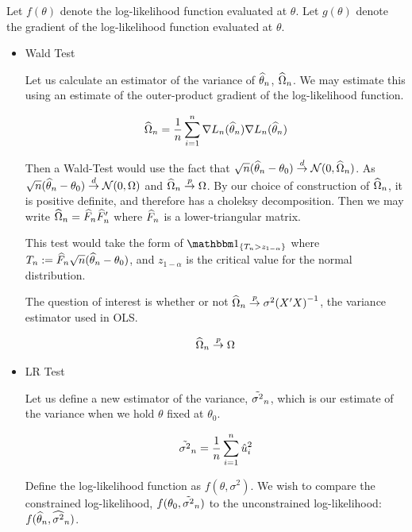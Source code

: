 \documentclass[12pt]{paper}
\begin{document}
Let $f(\theta)$ denote the log-likelihood function evaluated at $\theta$. Let
$g(\theta)$ denote the gradient of the log-likelihood function evaluated at
$\theta$. 
\begin{itemize}
\item Wald Test\newline

Let us calculate an estimator of the variance of $\widehat{ \theta }_{n}$,
$\widehat{ \Omega }_{n}$. We may estimate this using an estimate of the outer-product
gradient of the log-likelihood function.

\begin{equation*}
  \widehat{ \Omega }_{n} = \frac{1}{n} \sum_{i=1}^n \nabla L_n(\widehat{ \theta }_{n}) \nabla L_n( \widehat{ \theta }_{n})
\end{equation*}

Then a Wald-Test would use the fact that $\sqrt{n} ( \widehat{ \theta }_{n} - \theta_0)
\overset{d}{\to} \mathcal{N}( 0, \widehat{ \Omega }_{n})$. As $\sqrt{n} ( \widehat{ \theta }_{n} - \theta_0)
\overset{d}{\to} \mathcal{N}( 0, \Omega)$ and $\widehat{ \Omega }_{n} \overset{p}{\to} \Omega$. By our choice of
construction of $\widehat{ \Omega }_{n}$, it is positive definite, and therefore has
a choleksy decomposition. Then we may write $\widehat{ \Omega }_{n} = \widehat{ F }_{n}
\widehat{ F }_{n}'$ where $\widehat{ F }_{n}$ is a lower-triangular matrix. 

This test would take the form of $\indicate{ T_n > z_{1-\alpha}}$ where
$T_n := \widehat{ F }_{n} \sqrt{n}( \widehat{ \theta }_{n} - \theta_0)$, and $z_{1-\alpha}$ is the critical value
for the normal distribution.

The question of interest is whether or not $\widehat{ \Omega }_{n} \overset{p}{\to} \sigma^2
{(X'X)}^{-1}$, the variance estimator used in OLS.

\begin{align*}
  \widehat{ \Omega }_{n} &\overset{p}{\to} \Omega\\
\end{align*}




\item LR Test\newline

Let us define a new estimator of the variance, $\tilde{ \sigma^2 }_{n}$, which is
our estimate of the variance when we hold $\theta$ fixed at $\theta_0$.

\begin{equation*}
  \tilde{ \sigma^2 }_{n} = \frac{1}{n} \sum_{i=1}^n \hat{u}_i^2
\end{equation*}

Define the log-likelihood function as $f( \theta, \sigma^2 )$. We wish to
compare the constrained log-likelihood, $f(\theta_0, \tilde{ \sigma^2 }_{n})$ to the
unconstrained log-likelihood: $f( \widehat{ \theta }_{n}, \widehat{ \sigma^2 }_{n})$.


\end{itemize}
\end{document}
